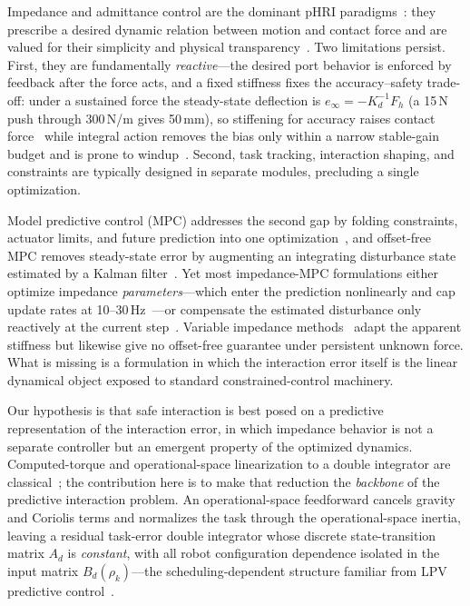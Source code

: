 \documentclass[journal]{IEEEtran}
\begin{document}
Impedance and admittance control are the dominant pHRI
paradigms~\cite{hogan1985impedance,chiaverini1999survey}: they prescribe a
desired dynamic relation between motion and contact force and are valued for
their simplicity and physical
transparency~\cite{villani2016force,albu2007unified}. Two limitations persist.
First, they are fundamentally \emph{reactive}---the desired port behavior is
enforced by feedback after the force acts, and a fixed stiffness fixes the
accuracy--safety trade-off: under a sustained force the steady-state deflection
is $e_\infty=-K_d^{-1}F_h$ (a 15\,N push through 300\,N/m gives 50\,mm), so
stiffening for accuracy raises contact force~\cite{haddadin2009requirements}
while integral action removes the bias only within a narrow stable-gain budget
and is prone to windup~\cite{cao2004antiwindup,cao2002antiwindup}. Second, task
tracking, interaction shaping, and constraints are typically designed in
separate modules, precluding a single optimization.

Model predictive control (MPC) addresses the second gap by folding
constraints, actuator limits, and future prediction into one
optimization~\cite{mayne2000constrained,mayne2014model}, and offset-free MPC
removes steady-state error by augmenting an integrating disturbance state
estimated by a Kalman filter~\cite{pannocchia2003disturbance}. Yet most
impedance-MPC formulations either optimize impedance \emph{parameters}---which
enter the prediction nonlinearly and cap update rates at
10--30\,Hz~\cite{cao2023passive,haninger2023model,roveda2019optimal}---or
compensate the estimated disturbance only reactively at the current
step~\cite{wu2025ensuring}. Variable impedance
methods~\cite{liu2025model,ikeura1995variable} adapt the apparent stiffness but
likewise give no offset-free guarantee under persistent unknown force. What is
missing is a formulation in which the interaction error itself is the linear
dynamical object exposed to standard constrained-control machinery.

Our hypothesis is that safe interaction is best posed on a predictive
representation of the interaction error, in which impedance behavior is not a
separate controller but an emergent property of the optimized dynamics.
Computed-torque and operational-space linearization to a double integrator are
classical~\cite{khatib1987unified,siciliano2009robotics}; the contribution here
is to make that reduction the \emph{backbone} of the predictive interaction
problem. An operational-space feedforward cancels gravity and Coriolis terms
and normalizes the task through the operational-space inertia, leaving a
residual task-error double integrator whose discrete state-transition matrix
$A_d$ is \emph{constant}, with all robot configuration dependence isolated in
the input matrix $B_d(\rho_k)$---the scheduling-dependent structure familiar
from LPV predictive control~\cite{cao2005minmax}.
\end{document}
